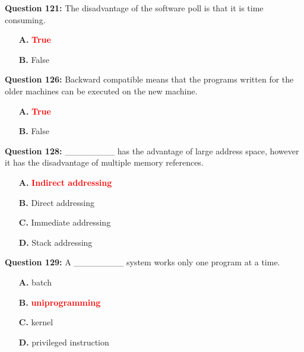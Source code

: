 \documentclass[12pt,a4paper]{article}
\begin{document}
\vspace{0.5cm}

\textbf{Question 121:} The disadvantage of the software poll is that it is time consuming.

\begin{itemize}
    \item[\textbf{A.}] \textcolor{red}{\textbf{True}}
    \item[\textbf{B.}] False
\end{itemize}

\vspace{0.5cm}

\textbf{Question 126:} Backward compatible means that the programs written for the older machines can be executed on the new machine.

\begin{itemize}
    \item[\textbf{A.}] \textcolor{red}{\textbf{True}}
    \item[\textbf{B.}] False
\end{itemize}

\vspace{0.5cm}

\textbf{Question 128:} ________ has the advantage of large address space, however it has the disadvantage of multiple memory references.

\begin{itemize}
    \item[\textbf{A.}] \textcolor{red}{\textbf{Indirect addressing}}
    \item[\textbf{B.}] Direct addressing
    \item[\textbf{C.}] Immediate addressing
    \item[\textbf{D.}] Stack addressing
\end{itemize}

\vspace{0.5cm}

\textbf{Question 129:} A ________ system works only one program at a time.

\begin{itemize}
    \item[\textbf{A.}] batch
    \item[\textbf{B.}] \textcolor{red}{\textbf{uniprogramming}}
    \item[\textbf{C.}] kernel
    \item[\textbf{D.}] privileged instruction
\end{itemize}

\vspace{0.5cm}
\end{document}
